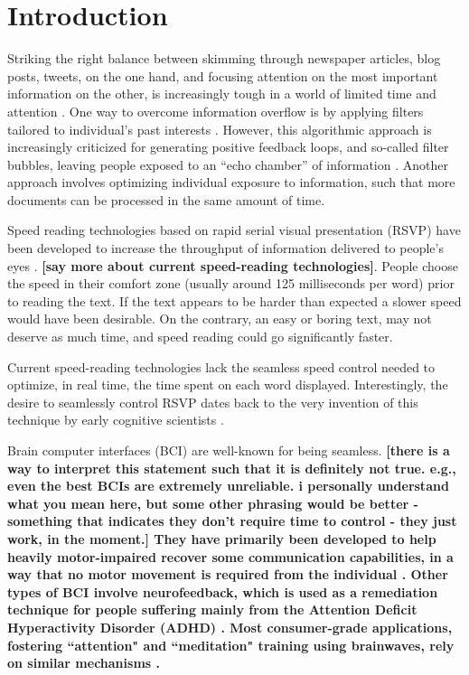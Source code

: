 \section{Introduction}
Striking the right balance between skimming through newspaper articles, blog posts, tweets, on the one hand, and focusing attention on the most important information on the other, is increasingly tough in a world of limited time \cite{maillart2011} and attention \cite{anham2006economics}. One way to overcome information overflow is by applying filters tailored to individual's past interests \cite{}. However, this algorithmic approach is increasingly criticized for generating positive feedback loops, and so-called filter bubbles, leaving people exposed to an ``echo chamber'' of information \cite{}. Another approach involves optimizing individual exposure to information, such that more documents can be processed in the same amount of time.

Speed reading technologies based on rapid serial visual presentation (RSVP) have been developed to increase the throughput of information delivered to people's eyes \cite{slate2014}. {\bf [say more about current speed-reading technologies]}. People choose the speed in their comfort zone (usually around 125 milliseconds per word) prior to reading the text. If the text appears to be harder than expected a slower speed would have been desirable. On the contrary, an easy or boring text, may not deserve as much time, and speed reading could go significantly faster.

Current speed-reading technologies lack the seamless speed control needed to optimize, in real time, the time spent on each word displayed. Interestingly, the desire to seamlessly control RSVP dates back to the very invention of this technique by early cognitive scientists \cite{}.

Brain computer interfaces (BCI) are well-known for being seamless. \bf {[there is a way to interpret this statement such that it is definitely not true. e.g., even the best BCIs are extremely unreliable. i personally understand what you mean here, but some other phrasing would be better - something that indicates they don't require time to control - they just work, in the moment.]} They have primarily been developed to help heavily motor-impaired recover some communication capabilities, in a way that no motor movement is required from the individual \cite{}. Other types of BCI involve neurofeedback, which is used as a remediation technique for people suffering mainly from the Attention Deficit Hyperactivity Disorder (ADHD) \cite{}. Most consumer-grade applications, fostering ``attention" and ``meditation" training using brainwaves, rely on similar mechanisms \cite{}.

